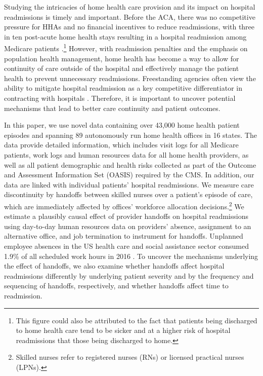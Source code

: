 \documentclass[final,12pt, notitlepage]{article}
\begin{document}
Studying the intricacies of home health care provision and its impact on hospital readmissions is timely and important. Before the ACA, there was no competitive pressure for HHAs and no financial incentives to reduce readmissions, with three in ten post-acute home health stays resulting in a hospital readmission among Medicare patients \citep{MedPAC2014hh}.\footnote{This figure could also be attributed to the fact that patients being discharged to home health care tend to be sicker and at a higher risk of hospital readmissions that those being discharged to home.
}
However, with readmission penalties and the emphasis on population health management, home health has become a way to allow for continuity of care outside of the hospital and effectively manage the patient health to prevent unnecessary readmissions.
Freestanding agencies often view the ability to mitigate hospital readmission as a key competitive differentiator in contracting with hospitals \citep{Worth2014}.
Therefore, it is important to uncover potential mechanisms that lead to better care continuity and patient outcomes.

In this paper, we use novel data containing over 43,000 home health patient episodes and spanning 89 autonomously run home health offices in 16 states. The data provide detailed information, which includes visit logs for all Medicare patients, work logs and human resources data for all home health providers, as well as all patient demographic and health risks collected as part of the Outcome and Assessment Information Set (OASIS) required by the CMS.
In addition, our data are linked with individual patients' hospital readmissions.
We measure care discontinuity by handoffs between skilled nurses over a patient's episode of care, which are immediately affected by offices' workforce allocation decisions.\footnote{Skilled nurses refer to registered nurses (RNs) or licensed practical nurses (LPNs).
}
We estimate a plausibly causal effect of provider handoffs on hospital readmissions using day-to-day human resources data on providers' absence, assignment to an alternative office, and job termination to instrument for handoffs.
Unplanned employee absences in the US health care and social assistance sector consumed 1.9\% of all scheduled work hours in 2016 \citep{BLS2017}.
To uncover the mechanisms underlying the effect of handoffs, we also examine whether handoffs affect hospital readmissions differently by underlying patient severity and by the frequency and sequencing of handoffs, respectively, and whether handoffs affect time to readmission.
\end{document}
